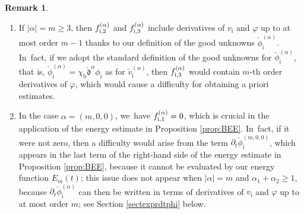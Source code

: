 \documentclass[JEP,XML,SOM,Unicode,NoFloatCountersInSection,published]{cedram}
\newenvironment{enumeratei}
{\bgroup\def\theenumi{\roman{enumi}}\def\theenumii{\arabic{enumii}}\begin{enumerate}}
{\end{enumerate}\egroup}
\newcommand{\dt}{\partial_t}
\newcommand{\cmfalpha}{\check{\mathfrak{d}}^{\alpha}}
\theoremstyle{definition}
\newtheorem{remark}[theorem]{Remark}
\begin{document}
\skpt
\begin{remark}\label{re:GU2}
\begin{enumeratei}
\item\label{re:GU2i}
If $|\alpha|=m\geq3$, then $f_{{\rm i},2}^{(\alpha)}$ and $f_{{\rm i},3}^{(\alpha)}$ include derivatives of $v_\mathrm{i}$ and $\varphi$ up to at most order $m-1$
thanks to our definition of the good unknowns $\check{\phi}_\mathrm{i}^{(\alpha)}$. In~fact, if we adopt the standard definition of the good unknowns for
$\check{\phi}_\mathrm{i}^{(\alpha)}$, that is, $\check{\phi}_\mathrm{i}^{(\alpha)}=\chi_\mathrm{b}\cmfalpha\phi_\mathrm{i}$ as for $\check{v}_\mathrm{i}^{(\alpha)}$,
then $f_{{\rm i},3}^{(\alpha)}$ would contain $m$-th order derivatives of $\varphi$, which would cause a difficulty for obtaining a priori estimates.

\item\label{re:GU2ii}
In the case $\alpha=(m,0,0)$, we~have $f_{{\rm i},1}^{(\alpha)}=0$, which is crucial in the application of the energy estimate in Proposition \ref{prop:BEE}. In~fact, if it were not zero, then a difficulty would arise from the term $\dt\check{\phi}_\mathrm{i}^{(m,0,0)}$,
which appears in the last term of the right-hand side of the energy estimate in Proposition \ref{prop:BEE},
because it cannot be evaluated by our energy function $E_m(t)$;
this issue does not appear when $|\alpha|=m$ and $\alpha_1+\alpha_2\geq1$,
because $\dt\check{\phi}_\mathrm{i}^{(\alpha)}$ can then be written in terms of derivatives of $v_\mathrm{i}$ and $\varphi$ up to at most order $m$;
see Section \ref{sectexprdtphi} below.
\end{enumeratei}
\end{remark}
\end{document}
